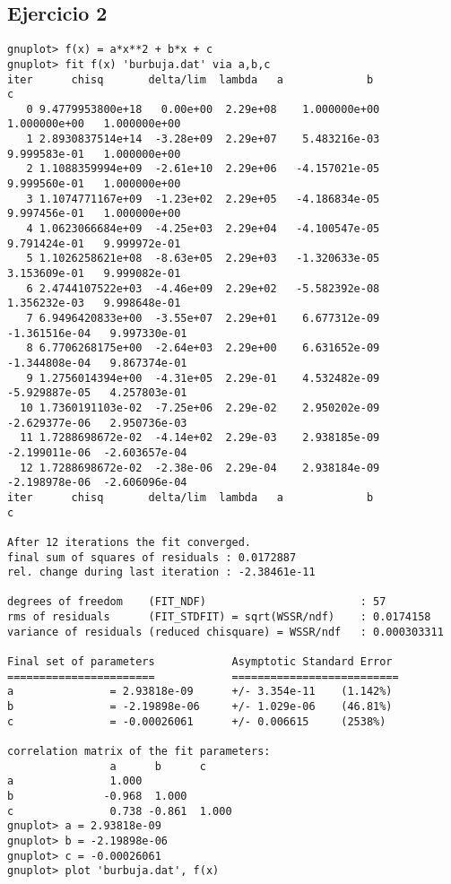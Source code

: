\subsection*{Ejercicio 2}
\begingroup
\fontsize{10pt}{12pt}\selectfont
\begin{verbatim}
gnuplot> f(x) = a*x**2 + b*x + c
gnuplot> fit f(x) 'burbuja.dat' via a,b,c
iter      chisq       delta/lim  lambda   a             b             c            
   0 9.4779953800e+18   0.00e+00  2.29e+08    1.000000e+00   1.000000e+00   1.000000e+00
   1 2.8930837514e+14  -3.28e+09  2.29e+07    5.483216e-03   9.999583e-01   1.000000e+00
   2 1.1088359994e+09  -2.61e+10  2.29e+06   -4.157021e-05   9.999560e-01   1.000000e+00
   3 1.1074771167e+09  -1.23e+02  2.29e+05   -4.186834e-05   9.997456e-01   1.000000e+00
   4 1.0623066684e+09  -4.25e+03  2.29e+04   -4.100547e-05   9.791424e-01   9.999972e-01
   5 1.1026258621e+08  -8.63e+05  2.29e+03   -1.320633e-05   3.153609e-01   9.999082e-01
   6 2.4744107522e+03  -4.46e+09  2.29e+02   -5.582392e-08   1.356232e-03   9.998648e-01
   7 6.9496420833e+00  -3.55e+07  2.29e+01    6.677312e-09  -1.361516e-04   9.997330e-01
   8 6.7706268175e+00  -2.64e+03  2.29e+00    6.631652e-09  -1.344808e-04   9.867374e-01
   9 1.2756014394e+00  -4.31e+05  2.29e-01    4.532482e-09  -5.929887e-05   4.257803e-01
  10 1.7360191103e-02  -7.25e+06  2.29e-02    2.950202e-09  -2.629377e-06   2.950736e-03
  11 1.7288698672e-02  -4.14e+02  2.29e-03    2.938185e-09  -2.199011e-06  -2.603657e-04
  12 1.7288698672e-02  -2.38e-06  2.29e-04    2.938184e-09  -2.198978e-06  -2.606096e-04
iter      chisq       delta/lim  lambda   a             b             c            

After 12 iterations the fit converged.
final sum of squares of residuals : 0.0172887
rel. change during last iteration : -2.38461e-11

degrees of freedom    (FIT_NDF)                        : 57
rms of residuals      (FIT_STDFIT) = sqrt(WSSR/ndf)    : 0.0174158
variance of residuals (reduced chisquare) = WSSR/ndf   : 0.000303311

Final set of parameters            Asymptotic Standard Error
=======================            ==========================
a               = 2.93818e-09      +/- 3.354e-11    (1.142%)
b               = -2.19898e-06     +/- 1.029e-06    (46.81%)
c               = -0.00026061      +/- 0.006615     (2538%)

correlation matrix of the fit parameters:
                a      b      c      
a               1.000 
b              -0.968  1.000 
c               0.738 -0.861  1.000 
gnuplot> a = 2.93818e-09
gnuplot> b = -2.19898e-06
gnuplot> c = -0.00026061
gnuplot> plot 'burbuja.dat', f(x)

\end{verbatim}
\endgroup